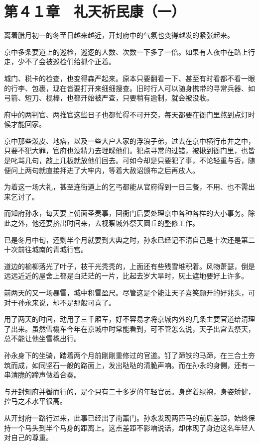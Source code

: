 \section{第４１章　礼天祈民康（一）}

离着腊月初一的冬至日越来越近，开封府中的气氛也变得越发的紧张起来。

京中多条要道上的巡检，巡逻的人数、次数一下多了一倍。如果有人夜中在路上行走，少不了会被巡检们给抓个正着。

城门、税卡的检查，也变得森严起来。原本只要翻看一下、甚至有时看都不看一眼的行李、包裹，现在皆要打开来细细搜查。旧时行人可以随身携带的寻常兵器、如弓箭、短刀、棍棒，也都开始被严查，只要稍有逾制，就会被没收。

府中的两判官、两推官这些日子也都忙得不可开交，每天都要在衙门里熬到点灯时候才能回家。

京中那些泼皮、地痞，以及一些大户人家的浮浪子弟，过去在京中横行市井之中，只要不犯大罪，官府也没精力去理睬他们。犯点寻常的过错，被揪到衙门里，也皆是叱骂几句，敲上几板就放他们回去。可如今却是只要犯了事，不论轻重与否，随便问上两句就直接押进了大牢内，等着大赦诏颁布之后再放人。

为着这一场大礼，甚至连街道上的乞丐都能从官府得到一日三餐，不用、也不需出来乞讨了。

而知府孙永，每天要上朝面圣奏事，回衙门后要处理京中各种各样的大小事务。除此之外，他还要挤出时间来，去视察城外祭天圜丘的整修工作。

已是冬月中旬，还剩半个月就要到大典之时，孙永已经记不清自己是十次还是第二十次前往城南的青城行宫。

道边的榆柳落光了叶子，枝干光秃秃的，上面还有些残雪堆积着。风物萧瑟，倒是远远近近的屋舍上都是白茫茫的一片，比起去岁大旱时，灰土遮地要好上许多。

前两天的又一场暴雪，城中积雪盈尺。尽管这是个能让天子喜笑颜开的好兆头，可对于孙永来说，却不是那般可喜了。

用了两天的时间，动用了三千厢军，好不容易才将京城内外的几条主要官道给清理了出来。虽然雪橇车今年在京城中时常能看到，可不管怎么说，天子出宫去祭天，总不能让他坐雪橇出行。

孙永身下的坐骑，踏着两个月前刚刚重修过的官道。钉了蹄铁的马蹄，在三合土夯筑而成，如同坚石一般的路面上，发出哒哒的清脆声响。而在孙永的身侧，还有一串清脆的蹄声做着合奏。

与开封知府并辔而行的，是个只有二十多岁的年轻官员。身穿着绿袍，身姿矫健，控马之术水平很高。

从开封府一路行过来，此事已经出了南薰门。孙永发现两匹马的前后差距，始终保持一个马头到半个马身的距离上。这点差距不影响说话，却体现了身边这名年轻人对自己的尊重。

